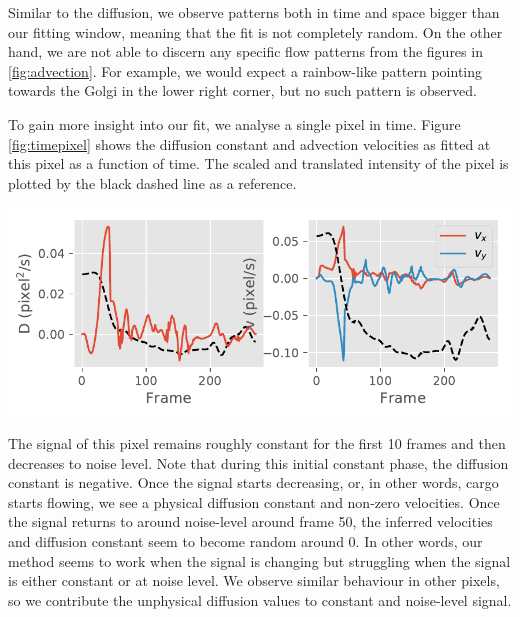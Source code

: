 \documentclass{Dissertate}
\let\origfigure\figure
\let\endorigfigure\endfigure
\renewenvironment{figure}[1][2] {
    \expandafter\origfigure\expandafter[H]
} {
    \endorigfigure
}
\begin{document}
Similar to the diffusion, we observe patterns both in time and space
bigger than our fitting window, meaning that the fit is not completely
random. On the other hand, we are not able to discern any specific flow patterns from the figures in \ref{fig:advection}. For example, we would expect a rainbow-like pattern pointing towards the Golgi
 in the lower right corner, but no such pattern is observed.
 
To gain more insight into
our fit, we analyse a single pixel in time. Figure
\ref{fig:timepixel} shows the diffusion constant and advection velocities as fitted at this pixel as a function of time. The scaled and translated intensity of the pixel is plotted by the black dashed line as a reference.


\begin{figure}
\hypertarget{fig:timepixel}{%
\centering
\includegraphics{source/figures/pdf/general_fit.pdf}
\caption{Diffusion and advection velocities of a single pixel in time.
We have plotted the scaled and translated signal as a black dashed line to
show the correlation.}\label{fig:timepixel}
}
\end{figure}

The signal of this pixel remains roughly constant for the first 10 frames and then decreases to noise level. Note that during this initial constant phase, the diffusion constant is negative. Once the signal starts
decreasing, or, in other words, cargo starts flowing, we
see a physical diffusion constant and non-zero velocities. Once the
signal returns to around noise-level around frame 50, the inferred
velocities and diffusion constant seem to become random around 0. In
other words, our method seems to work when the signal is changing but
struggling when the signal is either constant or at noise level. We
observe similar behaviour in other pixels, so we contribute the unphysical diffusion values to constant and noise-level signal.
\end{document}
